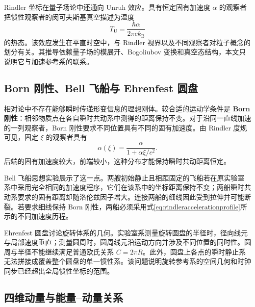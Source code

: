 \documentclass[style=classic,color=full]{lc-article}
\begin{document}
Rindler 坐标在量子场论中还通向 Unruh 效应。具有恒定固有加速度 $\alpha$ 的观察者把惯性观察者的闵可夫斯基真空描述为温度
\begin{equation}
  T_{\mathrm U}=\frac{\hbar\alpha}{2\pi c k_{\mathrm B}}
  \label{eq:unruhtemperature}
\end{equation}
的热态\cite{unruh1976}。该效应发生在平直时空中，与 Rindler 视界以及不同观察者对粒子概念的划分有关。其推导依赖量子场的模展开、Bogoliubov 变换和真空态结构，本文只说明它与加速参考系的联系。

\subsection{Born 刚性、Bell 飞船与 Ehrenfest 圆盘}

相对论中不存在能够瞬时传递形变信息的理想刚体。较合适的运动学条件是 \textbf{Born 刚性}：相邻物质点在各自瞬时共动系中测得的距离保持不变。对于沿同一直线加速的一列观察者，Born 刚性要求不同位置具有不同的固有加速度。由 Rindler 度规可见，固定 $\xi$ 的观察者具有
\begin{equation}
  \alpha(\xi)
  =\frac{\alpha}{1+\alpha\xi/c^2}.
  \label{eq:rindleraccelerationprofile}
\end{equation}
后端的固有加速度较大，前端较小，这种分布才能保持瞬时共动距离恒定。

Bell 飞船思想实验展示了这一点。两艘初始静止且相距固定的飞船若在原实验室系中采用完全相同的加速度程序，它们在该系中的坐标距离保持不变；两船瞬时共动系要求的固有距离却随洛伦兹因子增大。连接两船的细线因此受到拉伸并可能断裂。若要求细线保持 Born 刚性，两船必须采用式\eqref{eq:rindleraccelerationprofile}所示的不同加速度历程。

Ehrenfest 圆盘讨论旋转体系的几何。实验室系测量旋转圆盘的半径时，径向线元与局部速度垂直；测量圆周时，圆周线元沿运动方向并涉及不同位置的同时性。圆周与半径不能继续满足普通欧氏关系 $C=2\pi R$。此外，圆盘上各点的瞬时静止系无法拼接成覆盖整个圆盘的单一惯性系。该问题说明旋转参考系的空间几何和时钟同步已经超出全局惯性坐标的范围\cite{rindler,taylorwheeler}。

\subsection{四维动量与能量--动量关系}
\end{document}
